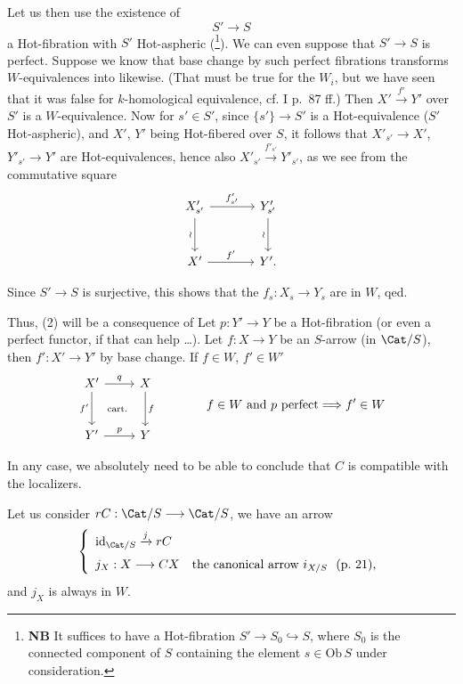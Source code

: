 Let us then use the existence of
\[ S' \longrightarrow S \]
a Hot-fibration with $S'$ Hot-aspheric (\footnote[15]{\textbf{NB} It suffices to have a Hot-fibration $S' \longrightarrow S_0 \hookrightarrow S$, where $S_0$ is the connected component of $S$ containing the element $s \in \mathrm{Ob}\,S$ under consideration.}). We can even suppose that $S' \longrightarrow S$ is perfect. Suppose we know that base change by such perfect fibrations transforms $W$-equivalences into likewise. (That must be true for the $W_i$, but we have seen that it was false for $k$-homological equivalence, cf. I p.~87 ff.) Then $X' \xrightarrow{f'} Y'$ over $S'$ is
a $W$-equivalence. Now for $s' \in S'$, since $\{s'\} \longrightarrow S'$ is a Hot-equivalence ($S'$ Hot-aspheric), and $X'$, $Y'$ being Hot-fibered over $S$, it follows that $X'_{s'} \longrightarrow X'$, $Y'_{s'} \longrightarrow Y'$ are Hot-equivalences, hence also $X'_{s'} \xrightarrow{f'_{s'}} Y'_{s'}$, as we see from the commutative square
\[
\begin{tikzcd}[row sep=large, column sep=large]
X'_{s'} \arrow[r, "f'_{s'}"] \arrow[d, "\wr"'] & Y'_{s'} \arrow[d, "\wr"'] \\
X' \arrow[r, "{f'}"] & Y'.
\end{tikzcd}
\]

Since $S' \longrightarrow S$ is surjective, this shows that the $f_s : X_s \longrightarrow Y_s$ are in $W$, qed.

Thus, (2) will be a consequence of  Let $p : Y' \longrightarrow Y$ be a Hot-fibration (or even a perfect functor, if that can help \dots). Let $f : X \longrightarrow Y$ be an $S$-arrow (in $\Cat/S$), then $f' : X' \longrightarrow Y'$ by base change. If $f \in W$, $f' \in W'$
\[
\begin{tikzcd}[row sep=large]
X' \arrow[r, "q"] \arrow[d, "{f'}"'] \arrow[dr, phantom, "\scriptstyle\text{cart.}"] & X \arrow[d, "f"] \\
Y' \arrow[r, "p"] & Y
\end{tikzcd}
\qquad\qquad
f \in W \text{ and } p \text{ perfect} \Longrightarrow f' \in W
\]

In any case, we absolutely need  to be able to conclude that $C$ is compatible with the localizers.

Let us consider $rC : \Cat/S \longrightarrow \Cat/S$, we have an arrow
\[
\left\{
\begin{array}{l}
\mathrm{id}_{\Cat/S} \xrightarrow{j} rC \\[1.5ex]
j_X : X \longrightarrow CX \quad \text{the canonical arrow } i_{X/S}\  \text{ (p.~21),}
\end{array}
\right.
\]
and $j_X$ is always in $W$.

